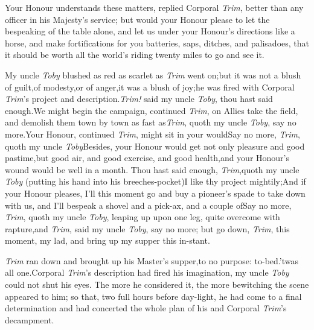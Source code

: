 \documentclass{article}
\begin{document}
Your Honour understands these matters, replied Corporal
\textit{Trim}, better than any officer in his Majesty’s
service;\tsk\break
but would your Honour please to let the bespeaking of the
table alone, and let us 
under your Honour’s directions like a horse, and make
fortifications for you
batteries, saps, ditches, and palisadoes, that it
should be worth all the world’s\break
riding twenty miles to go and see it.

\newpage
My uncle \textit{Toby} blushed as red as scarlet as \textit{Trim}
went on;\tsk but it was not a blush of guilt,\tsk of
modesty,\tsk or of anger,\tsk it was a blush of joy;\tsk he
was fired with Corporal \textit{Trim}’s project and
description.\tsk \textit{Trim!} said my uncle \textit{Toby}, thou
hast said enough.\tsk We might begin the campaign, continued
\textit{Trim}, on\break
{}
Allies take the field, and demolish them town by town as fast
as\tsh \textit{Trim}, quoth\break
my uncle \textit{Toby}, say no more.\tsk Your
Honour, continued \textit{Trim}, might sit in your 
would\tsh Say no more, \textit{Trim}, quoth my uncle
\textit{Toby}\tsh Besides, your Honour would get not only
pleasure and good pastime,\tsk but good air, and good exercise,
and good health,\tsk and your Honour’s
wound would be well in a month.\pb
Thou hast said enough, \textit{Trim},\tsk quoth my
uncle \textit{Toby} (putting his hand into his breeches-pocket)\tsh I like thy project
mightily;\tsk And if your Honour pleases, I’ll this moment
go and buy a pioneer’s spade to take down with us, and
I’ll bespeak a shovel and a pick-ax, and a couple
of\tsh Say no more, \textit{Trim}, quoth my uncle
\textit{Toby}, leaping up upon one leg, quite overcome with
rapture,\tsk and\break
{}
\textit{Trim}, said my uncle \textit{Toby}, say no
more;\tsk\break
but go down, \textit{Trim}, this moment, my lad, and
bring up my supper this in-\break stant.

\textit{Trim} ran down and brought up his Master’s
supper,\tsk to no purpose:\tsh\break
{}
\pb
to-bed.\tsk ’twas all one.\tsk Corporal \textit{Trim}’s
description had fired his imagination,\tsk\break
my uncle \textit{Toby} could not shut his eyes.\tsk\break
The more he considered it, the more 
bewitching the scene appeared to him;\tsk\break
so that, two full hours before day-light, he had
come to a final determination and had concerted the whole plan of his\break
and Corporal \textit{Trim}’s decampment.
\end{document}
